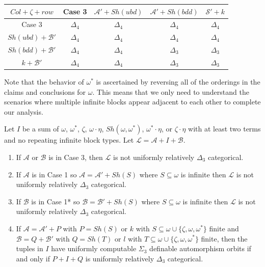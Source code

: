 \documentclass[11pt]{amsart}
\theoremstyle{definition}
\def\A{\mathcal A}
\def\B{\mathcal{B}}
\def\L{\mathcal L}
\def\S{{\mathcal S}}
\begin{document}
\begin{center}
\begin{tabular}{c|c|c|c|c}
     $Col+\zeta+row$& Case 3 & $\A'+Sh(ubd)$ & $\A'+Sh(bdd)$ & $\S'+k$\\
     \hline
   Case 3  & $\Delta_4$ & $\Delta_4$ & $\Delta_4$ & $\Delta_4$  \\   \hline
   $Sh(ubd)+\B'$  & $\Delta_4$ & $\Delta_4$ & $\Delta_4$ & $\Delta_4$ \\  \hline
   $Sh(bdd)+\B'$  & $\Delta_4$ & $\Delta_4$ & $\Delta_3$ & $\Delta_3$ 
   \\  \hline
   $k+\B'$  & $\Delta_4$ & $\Delta_4$ & $\Delta_3$ & $\Delta_3$
\end{tabular}
\end{center}

Note that the behavior of $\omega^*$ is ascertained by reversing all of the orderings in the claims and conclusions for $\omega$.
This means that we only need to understand the scenarios where multiple infinite blocks appear adjacent to each other to complete our analysis.

\begin{proposition}
    Let $I$ be a sum of $\omega$, $\omega^*$, $\zeta$, $\omega\cdot\eta$, $Sh(\omega,\omega^*)$, $\omega^*\cdot\eta$, or $\zeta\cdot\eta$ with at least two terms and no repeating infinite block types.
    Let $\L=\A+I+\B$.
        \begin{enumerate}
        \item If $\A$ or $\B$ is in Case 3, then $\L$ is not uniformly relatively $\Delta_3$ categorical.
        \item If $\A$ is in Case 1 so $\A=\A'+Sh(S)$ where $S\subseteq\omega$ is infinite then $\L$ is not uniformly relatively $\Delta_3$ categorical.
        \item If $\B$ is in Case 1* so $\B=\B'+Sh(S)$ where $S\subseteq\omega$ is infinite then $\L$ is not uniformly relatively $\Delta_3$ categorical.
        \item If $\A=\A'+P$ with $P=Sh(S)$ or $k$ with $S\subseteq\omega\cup\{\zeta, \omega, \omega^*\}$ finite and $\B=Q+\B'$ with $Q=Sh(T)$ or $l$ with $T\subseteq\omega\cup\{\zeta, \omega, \omega^*\}$ finite, then the tuples in $I$ have uniformly computable $\Sigma_3$ definable automorphism orbits if and only if $P+I+Q$ is uniformly relatively $\Delta_3$ categorical.
    \end{enumerate} 
\end{proposition}
\end{document}
